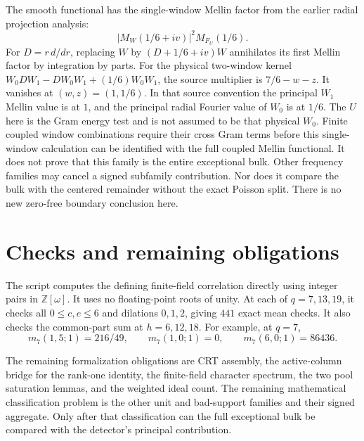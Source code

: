 \documentclass{article}
\begin{document}
The smooth functional has the single-window Mellin factor from the earlier
radial projection analysis:
\[
 |M_W(1/6+iv)|^2M_{F_U}(1/6).
\]
For $D=r\,d/dr$, replacing $W$ by $(D+1/6+iv)W$ annihilates its first
Mellin factor by integration by parts.
For the physical two-window kernel
$W_0DW_1-DW_0W_1+(1/6)W_0W_1$, the source multiplier is $7/6-w-z$.
It vanishes at $(w,z)=(1,1/6)$.
In that source convention the principal $W_1$ Mellin value is at $1$,
and the principal radial Fourier value of $W_0$ is at $1/6$.
The $U$ here is the Gram energy test and is not assumed to be that physical
$W_0$.
Finite coupled window combinations require their cross Gram terms before
this single-window calculation can be identified with the full coupled
Mellin functional.
It does not prove that this family is the entire exceptional bulk.
Other frequency families may cancel a signed subfamily contribution.
Nor does it compare the bulk with the centered remainder without the exact
Poisson split.
There is no new zero-free boundary conclusion here.

\section*{Checks and remaining obligations}

The script computes the defining finite-field correlation directly using
integer pairs in $\mathbb Z[\omega]$.
It uses no floating-point roots of unity.
At each of $q=7,13,19$, it checks all $0\le c,e\le6$ and dilations $0,1,2$,
giving $441$ exact mean checks.
It also checks the common-part sum at $h=6,12,18$.
For example, at $q=7$,
\[
 m_7(1,5;1)=216/49,\qquad m_7(1,0;1)=0,\qquad
 m_7(6,0;1)=86436.
\]

The remaining formalization obligations are CRT assembly, the active-column
bridge for the rank-one identity, the finite-field character spectrum,
the two pool saturation lemmas, and the weighted ideal count.
The remaining mathematical classification problem is the other unit and
bad-support families and their signed aggregate.
Only after that classification can the full exceptional bulk be compared
with the detector's principal contribution.
\end{document}
